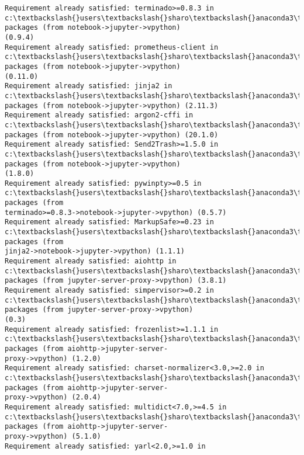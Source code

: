 \documentclass[11pt]{article}
\begin{document}
\begin{Verbatim}[commandchars=\\\{\}]
Requirement already satisfied: terminado>=0.8.3 in
c:\textbackslash{}users\textbackslash{}sharo\textbackslash{}anaconda3\textbackslash{}lib\textbackslash{}site-packages (from notebook->jupyter->vpython)
(0.9.4)
Requirement already satisfied: prometheus-client in
c:\textbackslash{}users\textbackslash{}sharo\textbackslash{}anaconda3\textbackslash{}lib\textbackslash{}site-packages (from notebook->jupyter->vpython)
(0.11.0)
Requirement already satisfied: jinja2 in c:\textbackslash{}users\textbackslash{}sharo\textbackslash{}anaconda3\textbackslash{}lib\textbackslash{}site-
packages (from notebook->jupyter->vpython) (2.11.3)
Requirement already satisfied: argon2-cffi in c:\textbackslash{}users\textbackslash{}sharo\textbackslash{}anaconda3\textbackslash{}lib\textbackslash{}site-
packages (from notebook->jupyter->vpython) (20.1.0)
Requirement already satisfied: Send2Trash>=1.5.0 in
c:\textbackslash{}users\textbackslash{}sharo\textbackslash{}anaconda3\textbackslash{}lib\textbackslash{}site-packages (from notebook->jupyter->vpython)
(1.8.0)
Requirement already satisfied: pywinpty>=0.5 in
c:\textbackslash{}users\textbackslash{}sharo\textbackslash{}anaconda3\textbackslash{}lib\textbackslash{}site-packages (from
terminado>=0.8.3->notebook->jupyter->vpython) (0.5.7)
Requirement already satisfied: MarkupSafe>=0.23 in
c:\textbackslash{}users\textbackslash{}sharo\textbackslash{}anaconda3\textbackslash{}lib\textbackslash{}site-packages (from
jinja2->notebook->jupyter->vpython) (1.1.1)
Requirement already satisfied: aiohttp in c:\textbackslash{}users\textbackslash{}sharo\textbackslash{}anaconda3\textbackslash{}lib\textbackslash{}site-
packages (from jupyter-server-proxy->vpython) (3.8.1)
Requirement already satisfied: simpervisor>=0.2 in
c:\textbackslash{}users\textbackslash{}sharo\textbackslash{}anaconda3\textbackslash{}lib\textbackslash{}site-packages (from jupyter-server-proxy->vpython)
(0.3)
Requirement already satisfied: frozenlist>=1.1.1 in
c:\textbackslash{}users\textbackslash{}sharo\textbackslash{}anaconda3\textbackslash{}lib\textbackslash{}site-packages (from aiohttp->jupyter-server-
proxy->vpython) (1.2.0)
Requirement already satisfied: charset-normalizer<3.0,>=2.0 in
c:\textbackslash{}users\textbackslash{}sharo\textbackslash{}anaconda3\textbackslash{}lib\textbackslash{}site-packages (from aiohttp->jupyter-server-
proxy->vpython) (2.0.4)
Requirement already satisfied: multidict<7.0,>=4.5 in
c:\textbackslash{}users\textbackslash{}sharo\textbackslash{}anaconda3\textbackslash{}lib\textbackslash{}site-packages (from aiohttp->jupyter-server-
proxy->vpython) (5.1.0)
Requirement already satisfied: yarl<2.0,>=1.0 in

\end{Verbatim}
\end{document}

